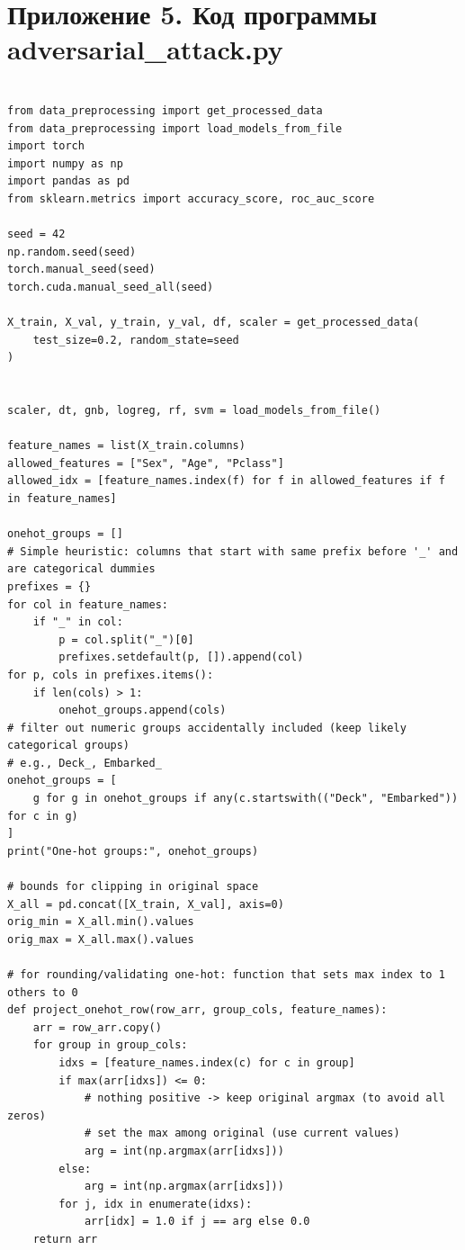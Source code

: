 \documentclass[14pt,a4paper]{extarticle}
\begin{document}
\section*{Приложение 5. Код программы adversarial\_attack.py}

\begin{verbatim}

from data_preprocessing import get_processed_data
from data_preprocessing import load_models_from_file
import torch
import numpy as np
import pandas as pd
from sklearn.metrics import accuracy_score, roc_auc_score

seed = 42
np.random.seed(seed)
torch.manual_seed(seed)
torch.cuda.manual_seed_all(seed)

X_train, X_val, y_train, y_val, df, scaler = get_processed_data(
    test_size=0.2, random_state=seed
)


scaler, dt, gnb, logreg, rf, svm = load_models_from_file()

feature_names = list(X_train.columns)
allowed_features = ["Sex", "Age", "Pclass"]
allowed_idx = [feature_names.index(f) for f in allowed_features if f in feature_names]

onehot_groups = []
# Simple heuristic: columns that start with same prefix before '_' and are categorical dummies
prefixes = {}
for col in feature_names:
    if "_" in col:
        p = col.split("_")[0]
        prefixes.setdefault(p, []).append(col)
for p, cols in prefixes.items():
    if len(cols) > 1:
        onehot_groups.append(cols)
# filter out numeric groups accidentally included (keep likely categorical groups)
# e.g., Deck_, Embarked_
onehot_groups = [
    g for g in onehot_groups if any(c.startswith(("Deck", "Embarked")) for c in g)
]
print("One-hot groups:", onehot_groups)

# bounds for clipping in original space
X_all = pd.concat([X_train, X_val], axis=0)
orig_min = X_all.min().values
orig_max = X_all.max().values

# for rounding/validating one-hot: function that sets max index to 1 others to 0
def project_onehot_row(row_arr, group_cols, feature_names):
    arr = row_arr.copy()
    for group in group_cols:
        idxs = [feature_names.index(c) for c in group]
        if max(arr[idxs]) <= 0:
            # nothing positive -> keep original argmax (to avoid all zeros)
            # set the max among original (use current values)
            arg = int(np.argmax(arr[idxs]))
        else:
            arg = int(np.argmax(arr[idxs]))
        for j, idx in enumerate(idxs):
            arr[idx] = 1.0 if j == arg else 0.0
    return arr


\end{verbatim}
\end{document}
